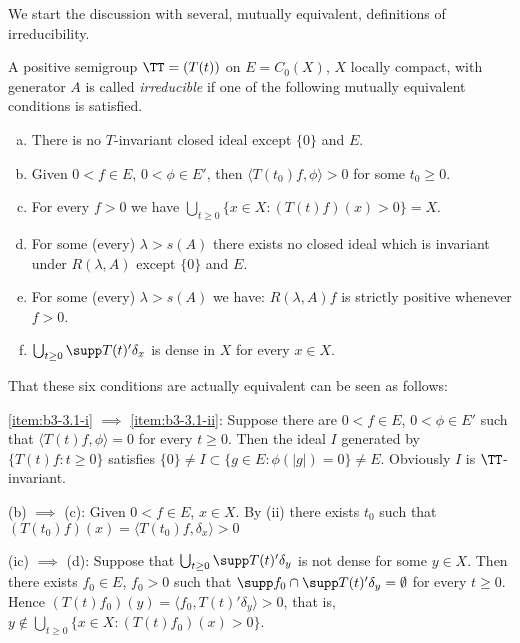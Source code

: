 We start the discussion with several, mutually equivalent, definitions of irreducibility. 

\begin{definition}\label{def:b3-3.1}
A positive semigroup $\TT = (T(t))$ on $E = C_{0}(X)$, $X$ locally compact, with generator $A$ is called \emph{irreducible} if one of the following mutually equivalent conditions is satisfied.
\begin{enumerate}[(a)]

\item\label{item:b3-3.1-i}
There is no $T$-invariant closed ideal except $\{0\}$ and $E$.
	
\item\label{item:b3-3.1-ii}
Given $0 < f \in E$, $0 < \phi \in E'$, then $\langle T(t_{0})f,\phi \rangle > 0$ for some $t_{0} \geq 0$.
	
\item
For every $f > 0$ we have $\bigcup_{t \geq 0}\{x \in X : (T(t)f)(x) > 0\} = X$.
	
\item
For some (every) $\lambda > s(A)$ there exists no closed ideal which is invariant under $R(\lambda,A)$ except $\{0\}$ and $E$.
	
\item
For some (every) $\lambda > s(A)$ we have: $R(\lambda,A)f$ is strictly positive whenever $f > 0$.
	
\item
$\bigcup_{t \geq 0}\supp T(t)'\delta_{x}$ is dense in $X$ for every $x \in X$.

\end{enumerate}
\end{definition}
That these six conditions are actually equivalent can be seen as follows:

\ref{item:b3-3.1-i} $\implies$ \ref{item:b3-3.1-ii}: Suppose there are $0 < f \in E$, $0 < \phi \in E'$ such that $\langle T(t)f,\phi \rangle = 0$ for every $t \geq 0$.
Then the ideal $I$ generated by $\{T(t)f : t \geq 0\}$ satisfies $\{0\} \neq I \subset \{g \in E : \phi(|g|) = 0\} \neq E$.
Obviously $I$ is $\TT$-invariant.

(b) $\implies$ (c): Given $0 < f \in E$, $x \in X$.
By (ii) there exists $t_{0}$ such that $(T(t_{0})f)(x) = \langle T(t_{0})f,\delta_{x} \rangle > 0$

(ic) $\implies$ (d): Suppose that $\bigcup_{t \geq 0}\supp T(t)'\delta_{y}$ is not dense for some $y \in X$.
Then there exists $f_{0} \in E$, $f_{0} > 0$ such that 
$\supp f_{0} \cap \supp T(t)'\delta_{y} = \emptyset$ for every $t \geq 0$.
Hence $(T(t)f_{0})(y) = \langle f_{0},T(t)'\delta_{y} \rangle > 0$, that is, $y \notin \bigcup_{t\geq 0}\{x \in X : (T(t)f_{0})(x) > 0\}$.

